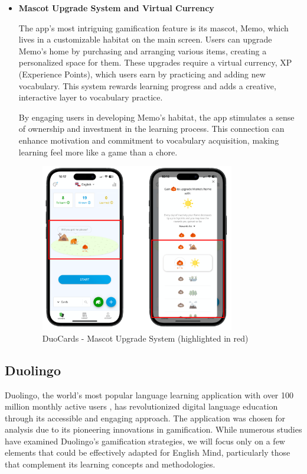 \begin{itemize}
    \item \textbf{Mascot Upgrade System and Virtual Currency}

    The app’s most intriguing gamification feature is its mascot, Memo, which lives in a customizable habitat on the main screen. Users can upgrade Memo’s home by purchasing and arranging various items, creating a personalized space for them. These upgrades require a virtual currency, XP (Experience Points), which users earn by practicing and adding new vocabulary. This system rewards learning progress and adds a creative, interactive layer to vocabulary practice.

    By engaging users in developing Memo’s habitat, the app stimulates a sense of ownership and investment in the learning process. This connection can enhance motivation and commitment to vocabulary acquisition, making learning feel more like a game than a chore. 

    \begin{figure}[!h]
        \includegraphics[width=0.8\textwidth]{chapters/images/duocards-memo.png}
        \caption{DuoCards - Mascot Upgrade System (highlighted in red)}
        \label{fig:duocards-memo}
    \end{figure}

\end{itemize}

\subsection{Duolingo}

Duolingo, the world's most popular language learning application with over 100 million monthly active users \cite{cite:duolingo_2024q2}, has revolutionized digital language education through its accessible and engaging approach. The application was chosen for analysis due to its pioneering innovations in gamification. While numerous studies have examined Duolingo's gamification strategies, we will focus only on a few elements that could be effectively adapted for English Mind, particularly those that complement its learning concepts and methodologies.

